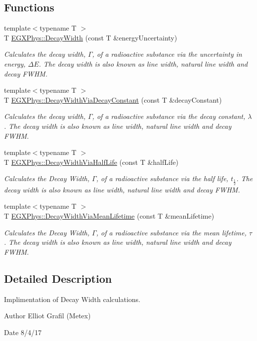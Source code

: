 \subsection*{Functions}
\begin{DoxyCompactItemize}
\item 
{\footnotesize template$<$typename T $>$ }\\T \hyperlink{group___decay_width_gae232ec8bb39710131be898c057a25620}{E\+G\+X\+Phys\+::\+Decay\+Width} (const T \&energy\+Uncertainty)
\begin{DoxyCompactList}\small\item\em Calculates the decay width, $\Gamma$, of a radioactive substance via the uncertainty in energy, $\Delta E$. The decay width is also known as line width, natural line width and decay F\+W\+HM. \end{DoxyCompactList}\item 
{\footnotesize template$<$typename T $>$ }\\T \hyperlink{group___decay_width_ga143a666966efecc535a59bb4f36a79c6}{E\+G\+X\+Phys\+::\+Decay\+Width\+Via\+Decay\+Constant} (const T \&decay\+Constant)
\begin{DoxyCompactList}\small\item\em Calculates the decay width, $\Gamma$, of a radioactive substance via the decay constant, $\lambda$. The decay width is also known as line width, natural line width and decay F\+W\+HM. \end{DoxyCompactList}\item 
{\footnotesize template$<$typename T $>$ }\\T \hyperlink{group___decay_width_ga1113224b24790a2e34032f9e90ad55c6}{E\+G\+X\+Phys\+::\+Decay\+Width\+Via\+Half\+Life} (const T \&half\+Life)
\begin{DoxyCompactList}\small\item\em Calculates the Decay Width, $\Gamma$, of a radioactive substance via the half life, $t_{\frac{1}{2}}$. The decay width is also known as line width, natural line width and decay F\+W\+HM. \end{DoxyCompactList}\item 
{\footnotesize template$<$typename T $>$ }\\T \hyperlink{group___decay_width_ga0b65d991f3f3d72cf09a4a7b343a01ca}{E\+G\+X\+Phys\+::\+Decay\+Width\+Via\+Mean\+Lifetime} (const T \&mean\+Lifetime)
\begin{DoxyCompactList}\small\item\em Calculates the Decay Width, $\Gamma$, of a radioactive substance via the mean lifetime, $\tau$. The decay width is also known as line width, natural line width and decay F\+W\+HM. \end{DoxyCompactList}\end{DoxyCompactItemize}


\subsection{Detailed Description}
Implimentation of Decay Width calculations. 

\begin{DoxyAuthor}{Author}
Elliot Grafil (Metex) 
\end{DoxyAuthor}
\begin{DoxyDate}{Date}
8/4/17 
\end{DoxyDate}
